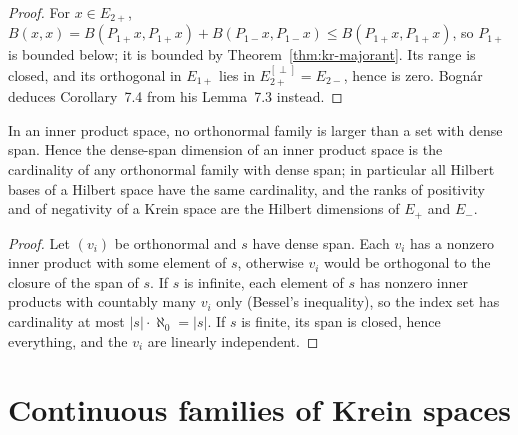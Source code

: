 \begin{proof}
  \leanok
  For $x \in E_{2+}$, $B(x, x) = B(P_{1+}x, P_{1+}x) + B(P_{1-}x, P_{1-}x) \le B(P_{1+}x, P_{1+}x)$,
  so $P_{1+}$ is bounded below; it is bounded by Theorem~\ref{thm:kr-majorant}. Its range is closed,
  and its orthogonal in $E_{1+}$ lies in $E_{2+}^{[\perp]} = E_{2-}$, hence is zero. Bognár deduces
  Corollary~7.4 from his Lemma~7.3 instead.
\end{proof}

\begin{theorem}
  \label{thm:kr-hilbert-dim}
  \leanok
  In an inner product space, no orthonormal family is larger than a set with dense span. Hence the
  dense-span dimension of an inner product space is the cardinality of any orthonormal family with
  dense span; in particular all Hilbert bases of a Hilbert space have the same cardinality, and the
  ranks of positivity and of negativity of a Krein space are the Hilbert dimensions of $E_+$ and
  $E_-$.
\end{theorem}

\begin{proof}
  \leanok
  Let $(v_i)$ be orthonormal and $s$ have dense span. Each $v_i$ has a nonzero inner product with
  some element of $s$, otherwise $v_i$ would be orthogonal to the closure of the span of $s$. If
  $s$ is infinite, each element of $s$ has nonzero inner products with countably many $v_i$ only
  (Bessel's inequality), so the index set has cardinality at most $|s| \cdot \aleph_0 = |s|$. If
  $s$ is finite, its span is closed, hence everything, and the $v_i$ are linearly independent.
\end{proof}

\section{Continuous families of Krein spaces}

